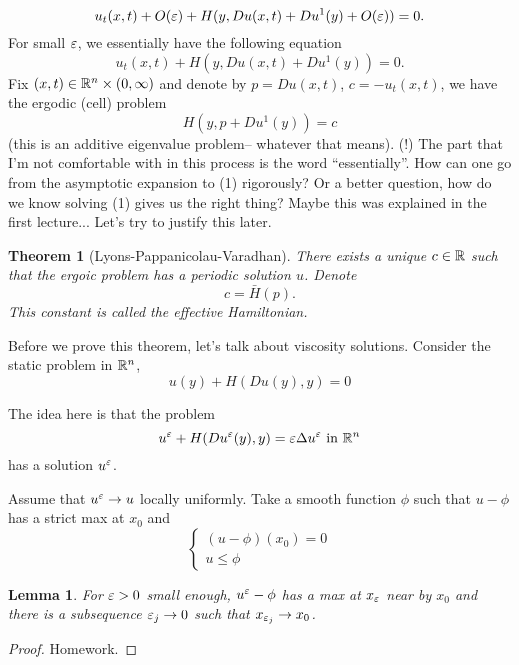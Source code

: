 \documentclass[11pt, oneside]{amsart}   	%
\newtheorem{theorem}{Theorem}
\newtheorem{lemma}{Lemma}
\begin{document}
$$u_t(x,t)+ O(\varepsilon) + H(y, Du(x,t)+ Du^1(y)+O(\varepsilon))=0.$$
For small $\varepsilon$, we essentially have the following equation
\begin{equation}
	u_t(x,t)+ H(y, Du(x,t)+Du^1(y))=0.
\end{equation}
Fix $(x,t)\in \mathbb{R}^n\times(0,\infty)$ and denote by $p=Du(x,t)$, $c=-u_t(x,t)$, we have the ergodic (cell) problem
\begin{equation}
	H(y, p + Du^1(y))=c \tag{$E_p$}
\end{equation}
(this is an additive eigenvalue problem-- whatever that means). (!) The part that I'm not comfortable with in this process is the word ``essentially''. How can one go from the asymptotic expansion to (1) rigorously? Or a better question, how do we know solving (1) gives us the right thing? Maybe this was explained in the first lecture... Let's try to justify this later.

\begin{theorem}[Lyons-Pappanicolau-Varadhan]
	There exists a unique $c\in \mathbb{R}$ such that the ergoic problem has a periodic solution $u$. Denote
	$$c=\bar{H}(p).$$ This constant is called the effective Hamiltonian.
\end{theorem}

Before we prove this theorem, let's talk about viscosity solutions. Consider the static problem in $\mathbb{R}^n$,
\begin{equation}
	u(y)+H(Du(y), y)=0 \tag{S}
\end{equation}

The idea here is that the problem
\begin{equation}
	u^\varepsilon + H(Du^\varepsilon(y), y)=\varepsilon\Delta u^\varepsilon \text{ in } \mathbb{R}^n
\end{equation}
has a solution $u^\varepsilon$.

Assume that $u^\varepsilon \to u$ locally uniformly. Take a smooth function $\phi$ such that $u-\phi$ has a strict max at $x_0$ and
\begin{equation}
	\begin{cases}
		(u-\phi)(x_0)=0\\
		u\le \phi
	\end{cases}
\end{equation}

\begin{lemma}
	For $\varepsilon>0$ small enough, $u^\varepsilon -\phi$ has a max at $x_\varepsilon$ near by $x_0$ and there is a subsequence $\varepsilon_j\to 0$ such that $x_{\varepsilon_j}\to x_0$.
\end{lemma}
\begin{proof} Homework.
\end{proof}
\end{document}
